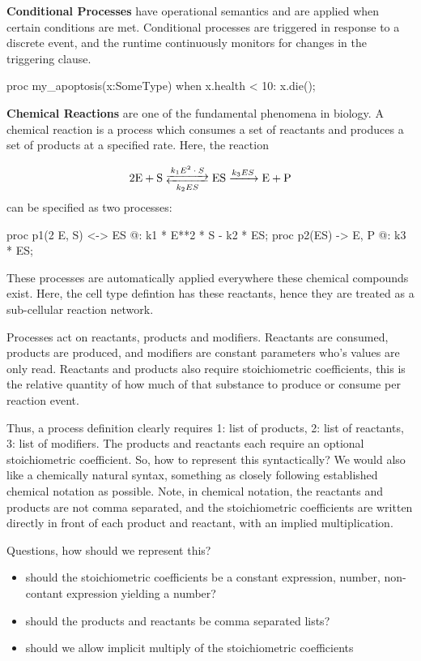 \documentclass[12pt]{article}
\begin{document}
\textbf{Conditional Processes} have operational semantics and are applied when certain conditions are met. Conditional processes are triggered in response to a discrete event, and the runtime continuously monitors for changes in the triggering clause.
%
%
\begin{python}
proc my_apoptosis(x:SomeType) when x.health < 10: 
    x.die();
\end{python}


\textbf{Chemical Reactions} are one of the fundamental phenomena in biology. A chemical reaction is a process which consumes a set of reactants and produces a set of products at a specified rate. Here, the reaction 

\begin{equation}
\ce{2 E + S <-->[$k_1 E^2 \cdot S$][$k_2 ES$] ES ->[$k_3 ES$] E + P } 
\end{equation}
can be specified as two processes:
\begin{python}
proc p1(2 E, S) <-> ES @: k1 * E**2 * S - k2 * ES; 
proc p2(ES) -> E, P @: k3 * ES;
\end{python}
These processes are automatically applied everywhere these chemical compounds exist. Here, the cell type defintion has these reactants, hence they are treated as a sub-cellular reaction network. 

Processes act on reactants, products and modifiers. Reactants are consumed, products are produced, and modifiers are constant parameters who's values are only read. Reactants and products also require stoichiometric coefficients, this is the relative quantity of how much of that substance to produce or consume per reaction event. 

Thus, a process definition clearly requires 1: list of products, 2: list of reactants, 3: list of modifiers. The products and reactants each require an optional stoichiometric coefficient. So, how to represent this syntactically? We would also like a chemically natural syntax, something as closely following established chemical notation as possible. Note, in chemical notation, the reactants and products are not comma separated, and the stoichiometric coefficients are written directly in front of each product and reactant, with an implied multiplication. 

Questions, how should we represent this?
\begin{itemize}
	\item should the stoichiometric coefficients be a constant expression, number, non-contant expression yielding a number?
	\item should the products and reactants be comma separated lists? 
	\item should we allow implicit multiply of the stoichiometric coefficients
\end{itemize}
\end{document}

